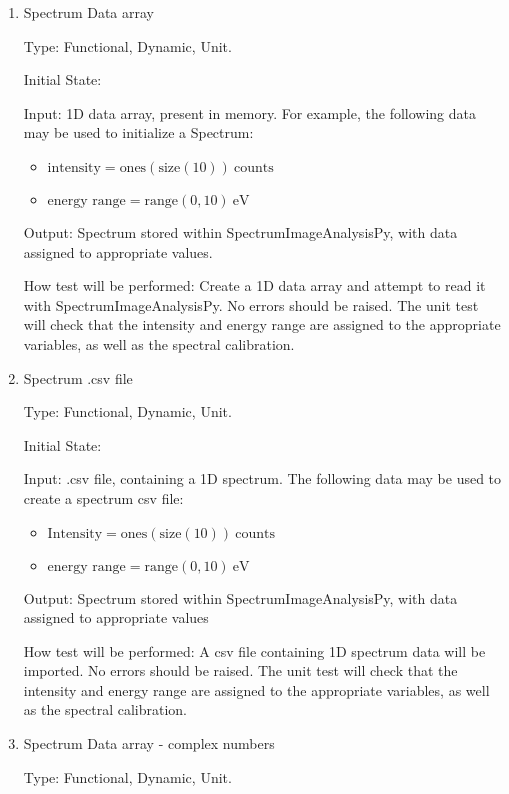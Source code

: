 \documentclass[12pt, titlepage]{article}
\newcommand{\progname}{SpectrumImageAnalysisPy}
\begin{document}
\begin{enumerate}

\item{Spectrum Data array}

Type: Functional, Dynamic, Unit.
					
Initial State: 
					
Input: 1D data array, present in memory. For example, the following data may be used to initialize a Spectrum:
\begin{itemize}
	\item $\text{intensity} = \text{ones}(\text{size}(10))\ \text{counts}$
	\item $\text{energy range} = \text{range}(0, 10)\ \si{\electronvolt}$
\end{itemize}

Output: Spectrum stored within \progname{}, with data assigned to appropriate values.
					
How test will be performed: Create a 1D data array and attempt to read it with \progname{}. No errors should be raised. The unit test will check that the intensity and energy range are assigned to the appropriate variables, as well as the spectral calibration.


\item{Spectrum .csv file}

Type: Functional, Dynamic, Unit.

Initial State: 

Input: .csv file, containing a 1D spectrum. The following data may be used to create a spectrum csv file:
\begin{itemize}
	\item $\text{Intensity} = \text{ones}(\text{size}(10))\ \text{counts}$
	\item $\text{energy range} = \text{range}(0, 10)\ \si{\electronvolt}$
\end{itemize}

Output: Spectrum stored within \progname{}, with data assigned to appropriate values

How test will be performed: A csv file containing 1D spectrum data will be imported. No errors should be raised. The unit test will check that the intensity and energy range are assigned to the appropriate variables, as well as the spectral calibration.


\item{Spectrum Data array - complex numbers}

Type: Functional, Dynamic, Unit.


\end{enumerate}
\end{document}
